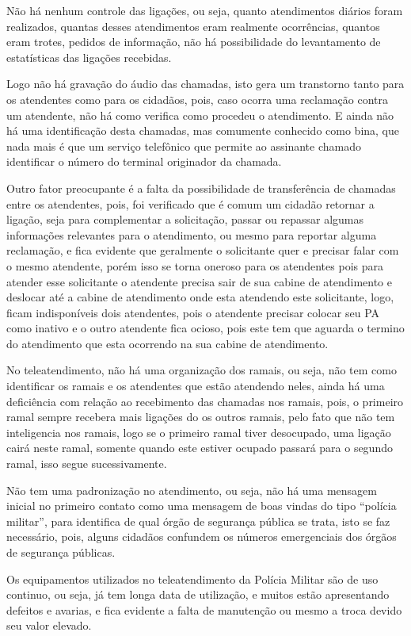 Não há nenhum controle das ligações, ou seja, quanto atendimentos diários foram realizados, quantas desses atendimentos eram realmente ocorrências, quantos eram trotes, pedidos de informação, não há possibilidade do levantamento de estatísticas das ligações recebidas.

Logo não há gravação do áudio das chamadas, isto gera um transtorno tanto para os atendentes como para os cidadãos, pois, caso ocorra uma reclamação contra um atendente, não há como verifica como procedeu o atendimento. E ainda não há uma identificação desta chamadas, mas comumente conhecido como bina, que nada mais é que um serviço telefônico que permite ao assinante chamado identificar o número do terminal originador da chamada.

Outro fator preocupante é a falta da possibilidade de transferência de chamadas entre os atendentes, pois, foi verificado que é comum um cidadão retornar a ligação, seja para complementar a solicitação, passar ou repassar algumas informações relevantes para o atendimento, ou mesmo para reportar alguma reclamação, e fica evidente que geralmente o solicitante quer e precisar falar com o mesmo atendente, porém isso se torna oneroso para os atendentes pois para atender esse solicitante o atendente precisa sair de sua cabine de atendimento e deslocar até a cabine de atendimento onde esta atendendo este solicitante, logo, ficam indisponíveis dois atendentes, pois o atendente precisar colocar seu PA como inativo e o outro atendente fica ocioso, pois este tem que aguarda o termino do atendimento que esta ocorrendo na sua cabine de atendimento.

No teleatendimento, não há uma organização dos ramais, ou seja, não tem como identificar os ramais e os atendentes que estão atendendo neles, ainda há uma deficiência com relação ao recebimento das chamadas nos ramais, pois, o primeiro ramal sempre recebera mais ligações do os outros ramais, pelo fato que não tem inteligencia nos ramais, logo se o primeiro ramal tiver desocupado, uma ligação cairá neste ramal, somente quando este estiver ocupado passará para o segundo ramal, isso segue sucessivamente.

Não tem uma padronização no atendimento, ou seja, não há uma mensagem inicial no primeiro contato como uma mensagem de boas vindas do tipo “polícia militar”, para identifica de qual órgão de segurança pública se trata, isto se faz necessário, pois, alguns cidadãos confundem os números emergenciais dos órgãos de segurança públicas.

Os equipamentos utilizados no teleatendimento da Polícia Militar são de uso continuo, ou seja, já tem longa data de utilização, e muitos estão apresentando defeitos e avarias, e fica evidente a falta de manutenção ou mesmo a troca devido seu valor elevado.

